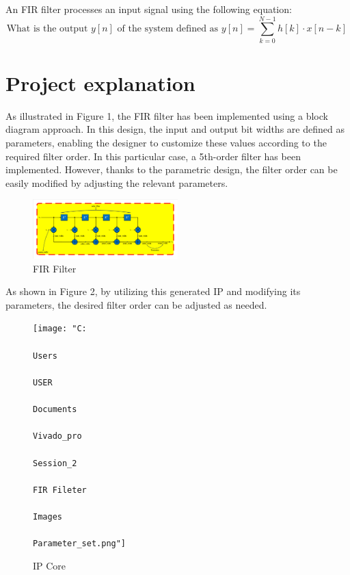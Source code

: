 \documentclass[paper=a4, fontsize=11pt, onecolumn]{scrartcl}	 %
\begin{document}
An FIR filter processes an input signal using the following equation:
\[
\text{What is the output } y[n] \text{ of the system defined as } 
y[n] = \sum_{k=0}^{N-1} h[k] \cdot x[n-k] \,
\]

\section*{Project explanation}



As illustrated in Figure 1, the FIR filter has been implemented using a block diagram approach. In this design, the input and output bit widths are defined as parameters, enabling the designer to customize these values according to the required filter order. In this particular case, a 5th-order filter has been implemented. However, thanks to the parametric design, the filter order can be easily modified by adjusting the relevant parameters.

\begin{figure}[ht]
  \centering
  \includegraphics[width=0.5\textwidth]{FIR.pdf}
  \caption{FIR Filter}
  \label{fig:sample-image1}
\end{figure}

As shown in Figure 2, by utilizing this generated IP and modifying its parameters, the desired filter order can be adjusted as needed.

\begin{figure}[ht]
    \centering
    \texttt{[image: "C:\\\\Users\\\\USER\\\\Documents\\\\Vivado\_pro\\\\Session\_2\\\\FIR Fileter\\\\Images\\\\Parameter\_set.png"]}
    \caption{IP Core}
    \label{fig:sample-image2}
\end{figure}
\end{document}
